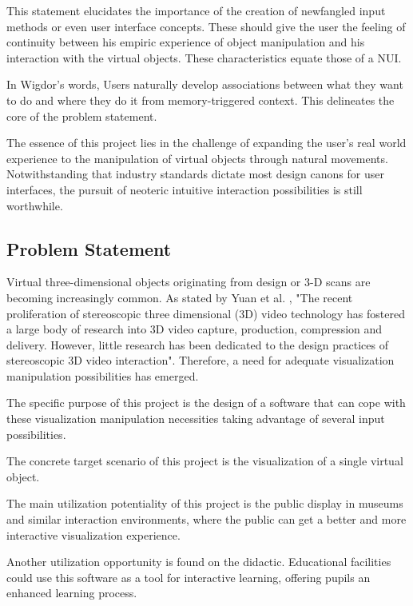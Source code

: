 \documentclass[12pt]{extarticle}
\begin{document}
This statement elucidates the importance of the creation of newfangled input methods or even user interface concepts. These should give the user the feeling of continuity between his empiric experience of object manipulation and his interaction with the virtual objects. These characteristics equate those of a NUI.

In Wigdor's words, \cite{NUIWorld} Users naturally develop associations between what they want to do and where they do it from memory-triggered context. This delineates the core of the problem statement.

The essence of this project lies in the challenge of expanding the user's real world experience to the manipulation of virtual objects through natural movements. Notwithstanding that industry standards dictate most design canons for user interfaces, the pursuit of neoteric intuitive interaction possibilities is still worthwhile.

\subsection{Problem Statement}
Virtual three-dimensional objects originating from design or 3-D scans are becoming increasingly common. As stated by Yuan et al. \cite{3DTV}, "The recent proliferation of stereoscopic three dimensional (3D) video technology has fostered a large body of research into 3D video capture, production, compression and delivery. However, little research has been dedicated to the design practices of stereoscopic 3D video interaction". Therefore, a need for adequate visualization manipulation possibilities has emerged.

The specific purpose of this project is the design of a software that can cope with these visualization manipulation necessities taking advantage of several input possibilities.

The concrete target scenario of this project is the visualization of a single virtual object.

The main utilization potentiality of this project is the public display in museums and similar interaction environments, where the public can get a better and more interactive visualization experience.

Another utilization opportunity is found on the didactic. Educational facilities could use this software as a tool for interactive learning, offering pupils an enhanced learning process.
\end{document}
